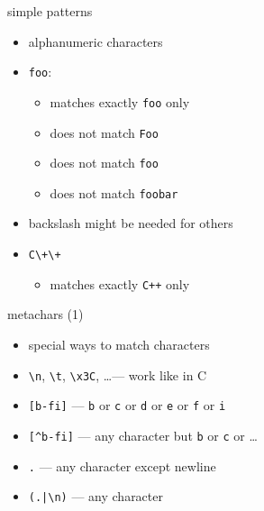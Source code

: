 \begin{frame}[fragile,label=simplePat]{simple patterns}
    \begin{itemize}
    \item alphanumeric characters 
    \item {\tt foo}:
        \begin{itemize}
        \item matches exactly {\tt foo} only
        \item does not match {\tt Foo}
        \item does not match \verb*|foo |
        \item does not match {\tt foobar}
        \end{itemize}
    \item backslash might be needed for others
    \item \verb|C\+\+|
        \begin{itemize}
        \item matches exactly {\tt C++} only
        \end{itemize}
    \end{itemize}
\end{frame}

\begin{frame}[fragile,label=meta1]{metachars (1)}
    \begin{itemize}
    \item special ways to match characters
    \vspace{.5cm}
    \item \verb|\n|, \verb|\t|, \verb|\x3C|, \ldots --- work like in C
    \item \verb|[b-fi]| --- {\tt b} or {\tt c} or {\tt d} or {\tt e} or {\tt f} or {\tt i}
    \item \verb|[^b-fi]| --- any character but {\tt b} or {\tt c} or \ldots
    \item {\tt .} --- any character except newline
    \item \verb!(.|\n)! --- any character
    \end{itemize}
\end{frame}


